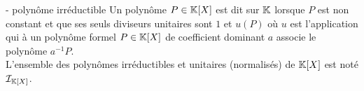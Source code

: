 


\begin{definition}{16.84}{ - polynôme irréductible}
    Un polynôme $P \in \mathbb{K}[X]$ est dit  sur $\mathbb{K}$ lorsque $P$ est non constant et que ses seuls diviseurs unitaires sont $1$ et $u(P)$ où $u$ est l'application qui à un polynôme formel $P \in \mathbb{K}[X]$ de coefficient dominant $a$ associe le polynôme $a^{-1}P$. \\ L'ensemble des polynômes irréductibles et unitaires (normalisés) de $\mathbb{K}[X]$ est noté $\mathcal{I}_{\mathbb{K}[X]}$. 
\end{definition}

